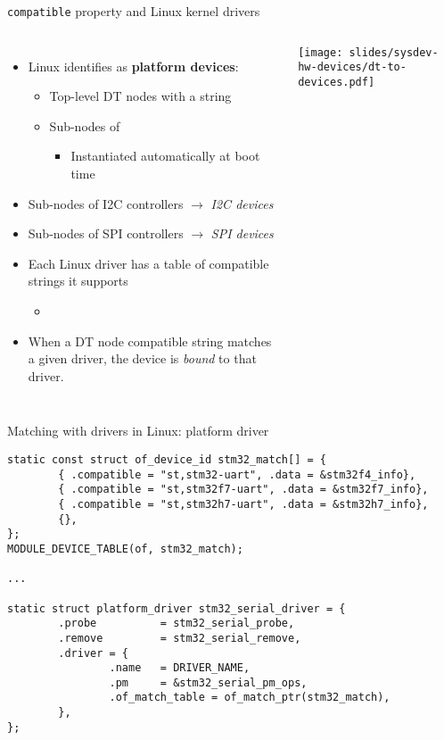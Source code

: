 \begin{frame}{{\tt compatible} property and Linux kernel drivers}
  \begin{columns}[T]
    \begin{itemize}
    \item Linux identifies as {\bf platform devices}:
      \begin{itemize}
      \item Top-level DT nodes with a  string
      \item Sub-nodes of 
        \begin{itemize}
        \item Instantiated automatically at boot time
        \end{itemize}
      \end{itemize}
    \item Sub-nodes of I2C controllers $\rightarrow$ {\em I2C devices}
    \item Sub-nodes of SPI controllers $\rightarrow$ {\em SPI devices}
    \item Each Linux driver has a table of compatible strings it supports
      \begin{itemize}
      \item {}\code{[]}
      \end{itemize}
    \item When a DT node compatible string matches a given driver, the
      device is {\em bound} to that driver.
    \end{itemize}
    \texttt{[image: slides/sysdev-hw-devices/dt-to-devices.pdf]}
  \end{columns}
\end{frame}

\begin{frame}[fragile]{Matching with drivers in Linux: platform driver}
  \begin{block}{}
    {\tiny
\begin{verbatim}
static const struct of_device_id stm32_match[] = {
        { .compatible = "st,stm32-uart", .data = &stm32f4_info},
        { .compatible = "st,stm32f7-uart", .data = &stm32f7_info},
        { .compatible = "st,stm32h7-uart", .data = &stm32h7_info},
        {},
};
MODULE_DEVICE_TABLE(of, stm32_match);

...

static struct platform_driver stm32_serial_driver = {
        .probe          = stm32_serial_probe,
        .remove         = stm32_serial_remove,
        .driver = {
                .name   = DRIVER_NAME,
                .pm     = &stm32_serial_pm_ops,
                .of_match_table = of_match_ptr(stm32_match),
        },
};
\end{verbatim}
    }
  \end{block}
\end{frame}

